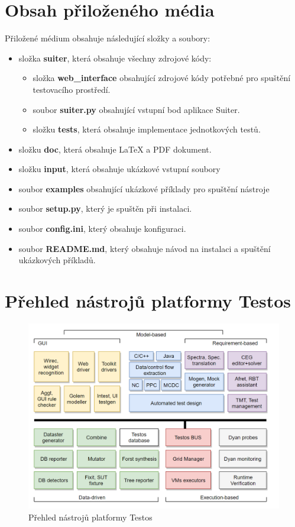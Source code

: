 \chapter{Obsah přiloženého média}
Přiložené médium obsahuje následující složky a soubory:

\begin{itemize}
  \item složka \textbf{suiter}, která obsahuje všechny zdrojové kódy:
  \begin{itemize}
	  \item složka \textbf{web\_interface} obsahující zdrojové kódy potřebné pro spuštění testovacího prostředí.
	  \item soubor \textbf{suiter.py} obsahující vstupní bod aplikace Suiter.
	  \item složku \textbf{tests}, která obsahuje implementace jednotkových testů.
  \end{itemize}
  \item složku \textbf{doc}, která obsahuje LaTeX a PDF dokument.
  \item složku \textbf{input}, která obsahuje ukázkové vstupní soubory
  \item soubor \textbf{examples} obsahující ukázkové příklady pro spuštění nástroje
  \item soubor \textbf{setup.py}, který je spuštěn při instalaci.
  \item soubor \textbf{config.ini}, který obsahuje konfiguraci.
  \item soubor \textbf{README.md}, který obsahuje návod na instalaci a spuštění ukázkových příkladů.
\end{itemize}



\chapter{Přehled nástrojů platformy Testos}
\label{chap_Testos}

\begin{figure}[hbt]
	\centering
	\includegraphics[width=1\textwidth]{obrazky-figures/testos.png}
	\caption{Přehled nástrojů platformy Testos}
	\label{fig_testos}
\end{figure}


